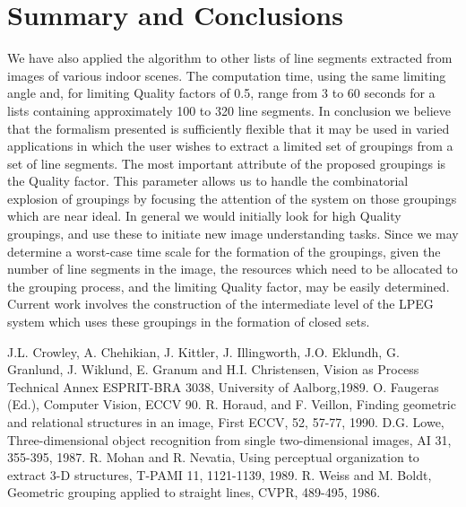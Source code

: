 \section{Summary and Conclusions}

 We have also applied the algorithm to other lists of line segments extracted
from images of various indoor scenes. The computation time, using the same 
limiting angle and, for limiting Quality factors of 0.5, range from 3 to 60
seconds for a lists containing approximately 100 to 320 line segments. 
In conclusion we
believe that the formalism presented is sufficiently flexible that it may be
used in varied applications in which the user wishes to extract a limited set
of groupings from a set of line segments. The most important attribute of the
proposed groupings is the Quality factor. This parameter allows us to handle
the combinatorial explosion of groupings by focusing the attention of the
system on those groupings which are near ideal. In general we would initially
look for high Quality groupings, and use these to initiate new image
understanding tasks. Since we may determine a worst-case time scale for the
formation of the groupings, given the number of line segments in the image, the
resources which need to be allocated to the grouping process, and the limiting
Quality factor, may be easily determined. Current work involves the construction
of the intermediate level of the LPEG system which uses these groupings in the
formation of closed sets. 

\begin{thebibliography}{1}

\vspace*{-2mm}
J.L. Crowley, A. Chehikian, J. Kittler, J. Illingworth, J.O. Eklundh, 
G. Granlund, J. Wiklund, E. Granum and H.I. Christensen, Vision as Process 
Technical Annex ESPRIT-BRA 3038, University of Aalborg,1989.
\vspace*{-2mm}
O. Faugeras (Ed.), Computer Vision, ECCV 90.
\vspace*{-2mm}
R. Horaud, and F. Veillon, Finding geometric and relational structures in an
image, First ECCV, 52, 57-77, 1990.
\vspace*{-2mm}
D.G. Lowe, Three-dimensional object recognition from single two-dimensional 
images, AI 31, 355-395, 1987.
\vspace*{-2mm}
R. Mohan and R. Nevatia, Using perceptual organization to extract 3-D 
structures, T-PAMI 11, 1121-1139, 1989.
\vspace*{-2mm}
R. Weiss and M. Boldt, Geometric grouping applied to straight lines, 
CVPR, 489-495, 1986.

\end{thebibliography}




